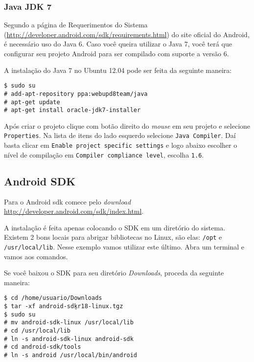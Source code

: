\subsubsection{Java JDK 7}

Segundo a página de Requerimentos do Sistema (\url{http://developer.android.com/sdk/requirements.html})
do site oficial do Android, é necessário uso do Java 6. Caso você queira utilizar o Java 7, você
terá que configurar seu projeto Android para ser compilado com suporte a versão 6.

A instalação do Java 7 no Ubuntu 12.04 pode ser feita da seguinte maneira:

\begin{flushleft}\texttt{\$ sudo su\\
\# add-apt-repository ppa:webupd8team/java\\
\# apt-get update\\
\# apt-get install oracle-jdk7-installer\\}
\end{flushleft}

Após criar o projeto clique com botão direito do \textit{mouse} em seu projeto e selecione
\texttt{Properties}. Na lista de itens do lado esquerdo selecione \texttt{Java Compiler}. Daí basta clicar
em \texttt{Enable project specific settings} e logo abaixo escolher o nível de compilação em
\texttt{Compiler compliance level}, escolha \texttt{1.6}.

\subsection{Android SDK \label{ssec:sdk}}

Para o Android \gls{sdk} comece pelo \textit{download} \url{http://developer.android.com/sdk/index.html}.

A instalação é feita apenas colocando o SDK em um diretório do sistema. Existem 2 bons locais para
abrigar bibliotecas no Linux, são elas: \texttt{/opt} e \texttt{/usr/local/lib}. Nesse exemplo vamos
utilizar este último. Abra um terminal e vamos aos comandos.

Se você baixou o SDK para seu diretório \textit{Downloads}, proceda da seguinte maneira:

\medskip

\begin{flushleft}
\texttt{\$ cd /home/usuario/Downloads \\
\$ tar -xf android-sdk\b{ }r18-linux.tgz \\
\$ sudo su \\
\# mv android-sdk-linux /usr/local/lib \\
\# cd /usr/local/lib \\
\# ln -s android-sdk-linux android-sdk \\
\# cd android-sdk/tools \\
\# ln -s android /usr/local/bin/android \\
}
\end{flushleft}

